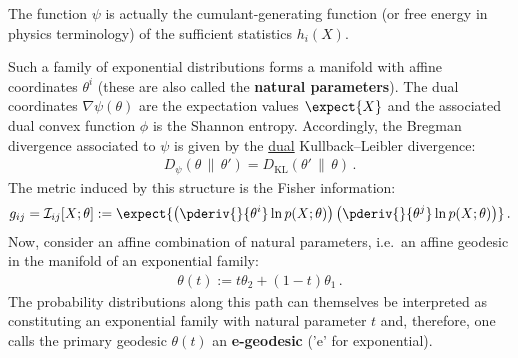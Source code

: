    \begin{remark}
        The function $\psi$ is actually the cumulant-generating function (or free energy in physics terminology) of the sufficient statistics $h_i(X)$.
    \end{remark}

    Such a family of exponential distributions forms a manifold with affine coordinates $\theta^i$ (these are also called the \textbf{natural parameters}). The dual coordinates $\nabla\psi(\theta)$ are the expectation values $\expect{X}$ and the associated dual convex function $\phi$ is the Shannon entropy. Accordingly, the Bregman divergence associated to $\psi$ is given by the \underline{dual} Kullback--Leibler divergence:
    \begin{gather}
        \label{info:KL_reversal}
        D_\psi(\theta\,\|\,\theta') = D_{\text{KL}}(\theta'\,\|\,\theta)\,.
    \end{gather}
    The metric induced by this structure is the Fisher information:
    \begin{gather}
        g_{ij} = \mathcal{I}_{ij}[X;\theta] := \expect{\left(\pderiv{}{\theta^i}\ln p(X;\theta)\right)\left(\pderiv{}{\theta^j}\ln p(X;\theta)\right)}\,.
    \end{gather}
    Now, consider an affine combination of natural parameters, i.e.~an affine geodesic in the manifold of an exponential family:
    \begin{gather}
        \theta(t) := t\theta_2 + (1-t)\theta_1\,.
    \end{gather}
    The probability distributions along this path can themselves be interpreted as constituting an exponential family with natural parameter $t$ and, therefore, one calls the primary geodesic $\theta(t)$ an \textbf{e-geodesic} ('e' for exponential).

